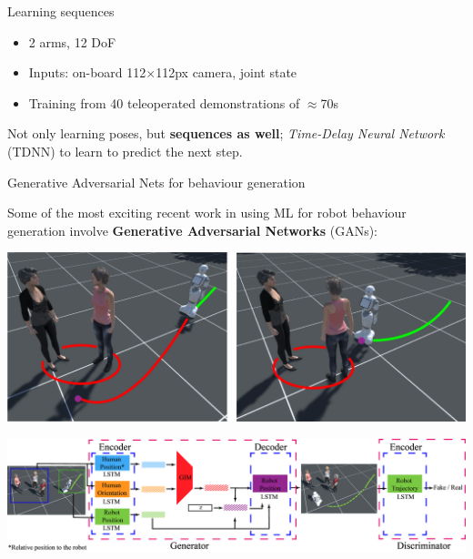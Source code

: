 \documentclass[compress,xcolor=table]{beamer}
\begin{document}
{
\begin{frame}{Learning sequences}

    \begin{center}
    \end{center}

    \begin{itemize}
        \item 2 arms, 12 DoF
        \item Inputs: on-board 112$\times$112px camera, joint state
        \item Training from 40 teleoperated demonstrations of $\approx$70s

    \end{itemize}

    Not only learning poses, but \textbf{sequences as well};    
    \emph{Time-Delay Neural Network} (TDNN) to learn to
    predict the next step.
\end{frame}
}

{

\begin{frame}{Generative Adversarial Nets for behaviour generation}

    Some of the most exciting recent work in using ML for robot behaviour
    generation involve \textbf{Generative Adversarial Networks} (GANs):

            \begin{center}
                \includegraphics[width=0.6\linewidth]{figs/generation/fangkai-yang-appgan-traj.png}

                \includegraphics[width=0.8\linewidth]{figs/generation/fangkai-yang-appgan.png}
            \end{center}
\end{frame}
}
\end{document}
